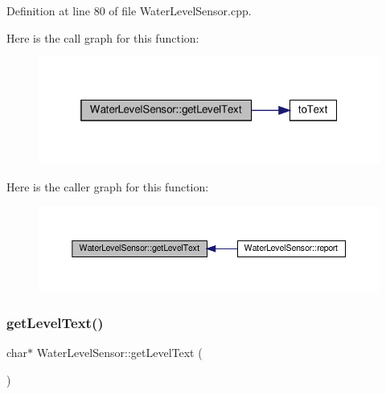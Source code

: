 Definition at line 80 of file Water\+Level\+Sensor.\+cpp.

Here is the call graph for this function\+:
\nopagebreak
\begin{figure}[H]
\begin{center}
\leavevmode
\includegraphics[width=319pt]{class_water_level_sensor_a8093a4963a9ac42e5f7c923db6758c1f_cgraph}
\end{center}
\end{figure}
Here is the caller graph for this function\+:
\nopagebreak
\begin{figure}[H]
\begin{center}
\leavevmode
\includegraphics[width=350pt]{class_water_level_sensor_a8093a4963a9ac42e5f7c923db6758c1f_icgraph}
\end{center}
\end{figure}
\mbox{\label{class_water_level_sensor_a8ce47502998f27993200d07c8c27856d}} 
\subsubsection{\texorpdfstring{get\+Level\+Text()}{getLevelText()}\hspace{0.1cm}{\footnotesize\ttfamily [2/2]}}
{\footnotesize\ttfamily char$\ast$ Water\+Level\+Sensor\+::get\+Level\+Text (\begin{DoxyParamCaption}{ }\end{DoxyParamCaption})}

\mbox{\label{class_water_level_sensor_a3e3ab8ae53f09d5c0ac6df1b3ba3671f}} 
